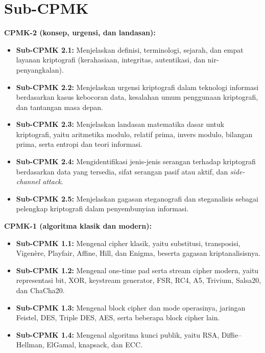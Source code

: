 \documentclass[../main.tex]{subfiles}
\begin{document}
\section*{Sub-CPMK}

\noindent\textbf{CPMK-2 (konsep, urgensi, dan landasan):}
\begin{itemize}
    \item \textbf{Sub-CPMK 2.1:} Menjelaskan definisi, terminologi, sejarah, dan
          empat layanan kriptografi (kerahasiaan, integritas, autentikasi, dan
          nir-penyangkalan).
    \item \textbf{Sub-CPMK 2.2:} Menjelaskan urgensi kriptografi dalam teknologi
          informasi berdasarkan kasus kebocoran data, kesalahan umum penggunaan
          kriptografi, dan tantangan masa depan.
    \item \textbf{Sub-CPMK 2.3:} Menjelaskan landasan matematika dasar untuk
          kriptografi, yaitu aritmetika modulo, relatif prima, invers modulo,
          bilangan prima, serta entropi dan teori informasi.
    \item \textbf{Sub-CPMK 2.4:} Mengidentifikasi jenis-jenis serangan terhadap
          kriptografi berdasarkan data yang tersedia, sifat serangan pasif atau
          aktif, dan \textit{side-channel attack}.
    \item \textbf{Sub-CPMK 2.5:} Menjelaskan gagasan steganografi dan steganalisis
          sebagai pelengkap kriptografi dalam penyembunyian informasi.
\end{itemize}

\noindent\textbf{CPMK-1 (algoritma klasik dan modern):}
\begin{itemize}
    \item \textbf{Sub-CPMK 1.1:} Mengenal cipher klasik, yaitu substitusi,
          transposisi, Vigen\`ere, Playfair, Affine, Hill, dan Enigma, beserta
          gagasan kriptanalisisnya.
    \item \textbf{Sub-CPMK 1.2:} Mengenal one-time pad serta stream cipher
          modern, yaitu representasi bit, XOR, keystream generator, FSR, RC4,
          A5, Trivium, Salsa20, dan ChaCha20.
    \item \textbf{Sub-CPMK 1.3:} Mengenal block cipher dan mode operasinya,
          jaringan Feistel, DES, Triple DES, AES, serta beberapa block cipher
          lain.
    \item \textbf{Sub-CPMK 1.4:} Mengenal algoritma kunci publik, yaitu RSA,
          Diffie--Hellman, ElGamal, knapsack, dan ECC.
\end{itemize}
\end{document}
